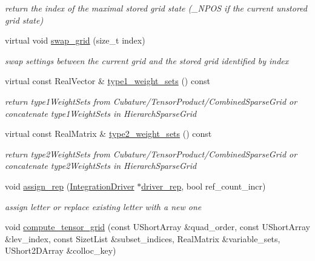 \begin{DoxyCompactItemize}
\begin{DoxyCompactList}\small\item\em return the index of the maximal stored grid state (\+\_\+\+N\+P\+OS if the current unstored grid state) \end{DoxyCompactList}\item 
virtual void \hyperlink{classPecos_1_1IntegrationDriver_ae42d43e21fe55d5b6cca7edf86e54818}{swap\+\_\+grid} (size\+\_\+t index)\label{classPecos_1_1IntegrationDriver_ae42d43e21fe55d5b6cca7edf86e54818}

\begin{DoxyCompactList}\small\item\em swap settings between the current grid and the stored grid identified by index \end{DoxyCompactList}\item 
virtual const Real\+Vector \& \hyperlink{classPecos_1_1IntegrationDriver_ae858d8bd4c244a98b0ff43c979b65e69}{type1\+\_\+weight\+\_\+sets} () const \label{classPecos_1_1IntegrationDriver_ae858d8bd4c244a98b0ff43c979b65e69}

\begin{DoxyCompactList}\small\item\em return type1\+Weight\+Sets from Cubature/\+Tensor\+Product/\+Combined\+Sparse\+Grid or concatenate type1\+Weight\+Sets in Hierarch\+Sparse\+Grid \end{DoxyCompactList}\item 
virtual const Real\+Matrix \& \hyperlink{classPecos_1_1IntegrationDriver_aacf52fa6f04443949a70c62ee3d718f7}{type2\+\_\+weight\+\_\+sets} () const \label{classPecos_1_1IntegrationDriver_aacf52fa6f04443949a70c62ee3d718f7}

\begin{DoxyCompactList}\small\item\em return type2\+Weight\+Sets from Cubature/\+Tensor\+Product/\+Combined\+Sparse\+Grid or concatenate type2\+Weight\+Sets in Hierarch\+Sparse\+Grid \end{DoxyCompactList}\item 
void \hyperlink{classPecos_1_1IntegrationDriver_ad25bbad4ddfa540696bd48d4a81c04dc}{assign\+\_\+rep} (\hyperlink{classPecos_1_1IntegrationDriver}{Integration\+Driver} $\ast$\hyperlink{classPecos_1_1IntegrationDriver_ad9ffab47d51875c80dc41a1ec9980649}{driver\+\_\+rep}, bool ref\+\_\+count\+\_\+incr)\label{classPecos_1_1IntegrationDriver_ad25bbad4ddfa540696bd48d4a81c04dc}

\begin{DoxyCompactList}\small\item\em assign letter or replace existing letter with a new one \end{DoxyCompactList}\item 
void \hyperlink{classPecos_1_1IntegrationDriver_a829957a61b9d2415054771d12a06d660}{compute\+\_\+tensor\+\_\+grid} (const U\+Short\+Array \&quad\+\_\+order, const U\+Short\+Array \&lev\+\_\+index, const Sizet\+List \&subset\+\_\+indices, Real\+Matrix \&variable\+\_\+sets, U\+Short2\+D\+Array \&colloc\+\_\+key)\label{classPecos_1_1IntegrationDriver_a829957a61b9d2415054771d12a06d660}


\end{DoxyCompactItemize}
